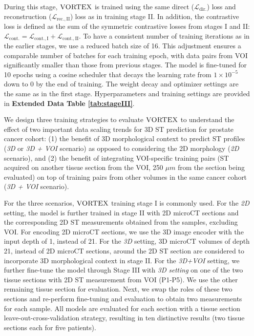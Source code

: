 During this stage, $\textsc{VORTEX}$ is trained using the same direct ($\mathcal{L}_{\text{dir.}}$) loss and reconstruction ($\mathcal{L}_{\text{rec.}, \mathrm{II}}$) loss as in training stage II. In addition, the contrastive loss is defined as the sum of the symmetric contrastive losses from stages I and II: $\mathcal{L}_{\text{cont.}} 
 = \mathcal{L}_{\text{cont.},\mathrm{I}} + \mathcal{L}_{\text{cont.},\mathrm{II}}$. %
To have a consistent number of training iterations as in the earlier stages, we use a reduced batch size of 16. This adjustment ensures a comparable number of batches for each training epoch, with data pairs from VOI significantly smaller than those from previous stages.
The model is fine-tuned for 10 epochs using a cosine scheduler that decays the learning rate from $1 \times 10^{-5}$ down to 0 by the end of training. The weight decay and optimizer settings are the same as in the first stage. Hyperparameters and training settings are provided in \textbf{Extended Data Table \ref{tab:stageIII}}.


We design three training strategies to evaluate $\textsc{VORTEX}$ to understand the effect of two important data scaling trends for 3D ST prediction for prostate cancer cohort: (1) the benefit of 3D morphological context to predict ST profiles (\textit{3D} or \textit{3D + VOI} scenario) as opposed to considering the 2D morphology (\textit{2D} scenario), and (2) the benefit of integrating VOI-specific training pairs (ST acquired on another tissue section from the VOI, 250 $\mu m$ from the section being evaluated) on top of training pairs from other volumes in the same cancer cohort (\textit{3D + VOI} scenario).

For the three scenarios, $\textsc{VORTEX}$ training stage I is commonly used. For the \textit{2D} setting, the model is further trained in stage II with 2D microCT sections and the corresponding 2D ST measurements obtained from the samples, excluding VOI. For encoding 2D microCT sections, we use the 3D image encoder with the input depth of 1, instead of 21. For the \textit{3D} setting, 3D microCT volumes of depth 21, instead of 2D microCT sections, around the 2D ST section are considered to incorporate 3D morphological context in stage II. 
For the \textit{3D+VOI} setting, we further fine-tune the model through Stage III with \textit{3D setting} on one of the two tissue sections with 2D ST measurement from VOI (P1-P5). We use the other remaining tissue section for evaluation. Next, we swap the roles of these two sections and re-perform fine-tuning and evaluation to obtain two measurements for each sample.  
All models are evaluated for each section with a tissue section leave-out-cross-validation strategy, resulting in ten distinctive results (two tissue sections each for five patients).


